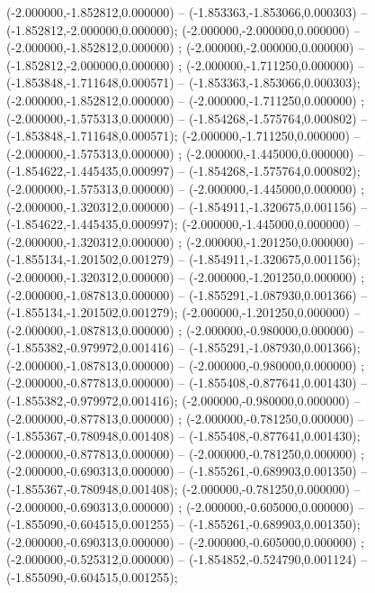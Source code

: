  (-2.000000,-1.852812,0.000000) -- (-1.853363,-1.853066,0.000303) -- (-1.852812,-2.000000,0.000000);
 (-2.000000,-2.000000,0.000000) -- (-2.000000,-1.852812,0.000000) ;
 (-2.000000,-2.000000,0.000000) -- (-1.852812,-2.000000,0.000000) ;
 (-2.000000,-1.711250,0.000000) -- (-1.853848,-1.711648,0.000571) -- (-1.853363,-1.853066,0.000303);
 (-2.000000,-1.852812,0.000000) -- (-2.000000,-1.711250,0.000000) ;
 (-2.000000,-1.575313,0.000000) -- (-1.854268,-1.575764,0.000802) -- (-1.853848,-1.711648,0.000571);
 (-2.000000,-1.711250,0.000000) -- (-2.000000,-1.575313,0.000000) ;
 (-2.000000,-1.445000,0.000000) -- (-1.854622,-1.445435,0.000997) -- (-1.854268,-1.575764,0.000802);
 (-2.000000,-1.575313,0.000000) -- (-2.000000,-1.445000,0.000000) ;
 (-2.000000,-1.320312,0.000000) -- (-1.854911,-1.320675,0.001156) -- (-1.854622,-1.445435,0.000997);
 (-2.000000,-1.445000,0.000000) -- (-2.000000,-1.320312,0.000000) ;
 (-2.000000,-1.201250,0.000000) -- (-1.855134,-1.201502,0.001279) -- (-1.854911,-1.320675,0.001156);
 (-2.000000,-1.320312,0.000000) -- (-2.000000,-1.201250,0.000000) ;
 (-2.000000,-1.087813,0.000000) -- (-1.855291,-1.087930,0.001366) -- (-1.855134,-1.201502,0.001279);
 (-2.000000,-1.201250,0.000000) -- (-2.000000,-1.087813,0.000000) ;
 (-2.000000,-0.980000,0.000000) -- (-1.855382,-0.979972,0.001416) -- (-1.855291,-1.087930,0.001366);
 (-2.000000,-1.087813,0.000000) -- (-2.000000,-0.980000,0.000000) ;
 (-2.000000,-0.877813,0.000000) -- (-1.855408,-0.877641,0.001430) -- (-1.855382,-0.979972,0.001416);
 (-2.000000,-0.980000,0.000000) -- (-2.000000,-0.877813,0.000000) ;
 (-2.000000,-0.781250,0.000000) -- (-1.855367,-0.780948,0.001408) -- (-1.855408,-0.877641,0.001430);
 (-2.000000,-0.877813,0.000000) -- (-2.000000,-0.781250,0.000000) ;
 (-2.000000,-0.690313,0.000000) -- (-1.855261,-0.689903,0.001350) -- (-1.855367,-0.780948,0.001408);
 (-2.000000,-0.781250,0.000000) -- (-2.000000,-0.690313,0.000000) ;
 (-2.000000,-0.605000,0.000000) -- (-1.855090,-0.604515,0.001255) -- (-1.855261,-0.689903,0.001350);
 (-2.000000,-0.690313,0.000000) -- (-2.000000,-0.605000,0.000000) ;
 (-2.000000,-0.525312,0.000000) -- (-1.854852,-0.524790,0.001124) -- (-1.855090,-0.604515,0.001255);
